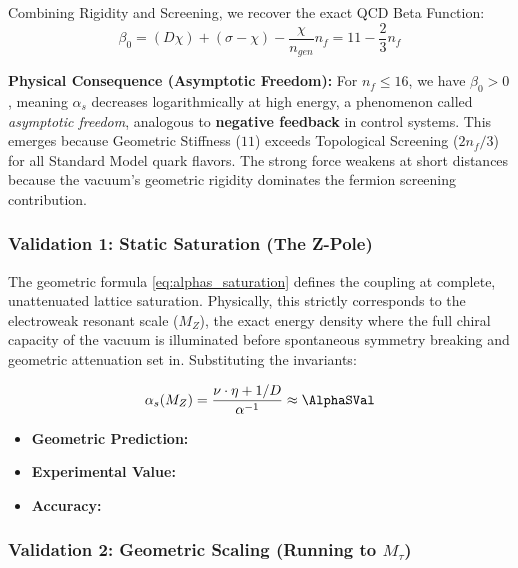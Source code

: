 Combining Rigidity and Screening, we recover the exact QCD Beta Function:
\begin{equation} \label{eq:beta_qcd}
    \beta_0 = (D\chi) + (\sigma-\chi) - \frac{\chi}{n_{gen}} n_f = 11 - \frac{2}{3}n_f
\end{equation}

\textbf{Physical Consequence (Asymptotic Freedom):} For $n_f \leq 16$, we have $\beta_0 > 0$, meaning $\alpha_s$ decreases logarithmically at high energy, a phenomenon called \textit{asymptotic freedom}, analogous to \textbf{negative feedback} in control systems. This emerges because Geometric Stiffness ($11$) exceeds Topological Screening ($2n_f/3$) for all Standard Model quark flavors. The strong force weakens at short distances because the vacuum's geometric rigidity dominates the fermion screening contribution.

\subsubsection{Validation 1: Static Saturation (The Z-Pole)}
The geometric formula \eqref{eq:alphas_saturation} defines the coupling at complete, unattenuated lattice saturation. Physically, this strictly corresponds to the electroweak resonant scale ($M_Z$), the exact energy density where the full chiral capacity of the vacuum is illuminated before spontaneous symmetry breaking and geometric attenuation set in. Substituting the invariants:

\begin{equation}
\alpha_s(M_Z) = \frac{\nu \cdot \eta + 1/D}{\alpha^{-1}}
\approx \mathbf{\AlphaSVal}
\end{equation}

\begin{itemize}
\item \textbf{Geometric Prediction:} \AlphaSVal
\item \textbf{Experimental Value:} \AlphaSExperimentalValue
\item \textbf{Accuracy:} \AlphaSAccText
\end{itemize}


\subsubsection{Validation 2: Geometric Scaling (Running to \texorpdfstring{$M_\tau$}{Mtau})}

